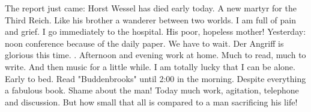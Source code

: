 The report just came: Horst Wessel has died early today. A new martyr for the Third Reich. Like his brother a wanderer between two worlds. I am full of pain and grief. I go immediately to the hospital. His poor, hopeless mother!
Yesterday: noon conference because of the daily paper. We have to wait. Der Angriff is glorious this time. . Afternoon and evening work at home. Much to read, much to write. And then music for a little while. I am totally lucky that I can be alone. Early to bed. Read "Buddenbrooks" until 2:00 in the morning. Despite everything a fabulous book. Shame about the man! Today much work, agitation, telephone and discussion. But how small that all is compared to a man sacrificing his life!

